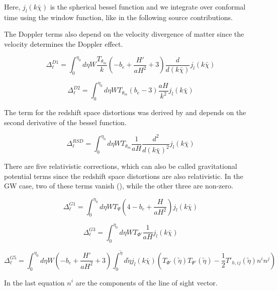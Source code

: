 Here, $j_l(k \bar{\chi})$ is the spherical bessel function and we integrate over conformal time using the window function, like in the following source contributions.

The Doppler terms also depend on the velocity divergence of matter since the velocity determines the Doppler effect.

\begin{equation}
    \Delta_\ell^{D1}=\int_0^{\eta_0} d\eta W \frac{T_{\theta_m}}{k} \left(-b_e + \frac{H'}{aH^2}+3\right)\frac{d}{d(k\bar{\chi})} j_l(k \bar{\chi})
\end{equation}

\begin{equation}
    \Delta_\ell^{D2}=\int_0^{\eta_0} d\eta W T_{\theta_m}(b_e-3) \frac{aH}{k^2} j_l(k \bar{\chi})
\end{equation}

The term for the redshift space distortions was derived by \cite{kaiser} and depends on the second derivative of the bessel function.

\begin{equation}
    \Delta_\ell^{RSD}=\int_0^{\eta_0} d\eta W T_{\theta_m} \frac{1}{aH}\frac{d^2}{d(k\bar{\chi})^2} j_l(k \bar{\chi})
\end{equation}

There are five relativistic corrections, which can also be called gravitational potential terms since the redshift space distortions are also relativistic. In the GW case, two of these terms vanish (\cite{dallarmi_dipole_2022}), while the other three are non-zero.

\begin{equation}
    \Delta_\ell^{G1}=\int_0^{\eta_0} d\eta W T_\Psi \left(4-b_e+\frac{H}{aH^2}\right) j_l(k \bar{\chi})
\end{equation}

\begin{equation}
    \Delta_\ell^{G3}=\int_0^{\eta_0} d\eta W T_{\Phi'} \frac{1}{aH} j_l(k \bar{\chi})
\end{equation}

\begin{equation}
    \Delta_\ell^{G5}=\int_0^{\eta_0} d\eta W \left(-b_e + \frac{H'}{aH^2} +3\right) \int_0^{\tilde{\eta}} d\tilde{\eta} j_l(k \bar{\chi}) \left( T_{\Phi'}(\tilde{\eta})T_{\Psi'}(\tilde{\eta})-\frac{1}{2}T'_{h, ij}(\tilde{\eta})n^i n^j \right)
\end{equation}

In the last equation $n^i$ are the components of the line of sight vector.

